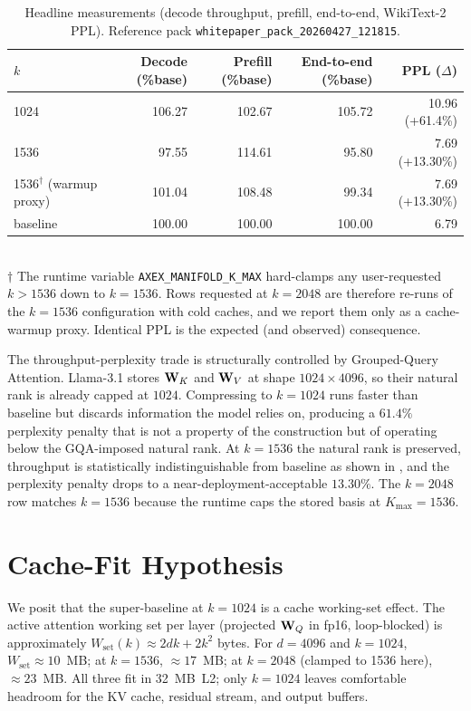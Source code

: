 \documentclass[11pt]{article}
\begin{document}
\begin{table}[h]\centering\small
\caption{Headline measurements (decode throughput, prefill, end-to-end,
WikiText-2 PPL).  Reference pack \texttt{whitepaper\_pack\_20260427\_121815}.}
\label{tab:headline}
\begin{tabular}{@{}lrrrr@{}}
\toprule
$k$ & Decode (\%base) & Prefill (\%base) & End-to-end (\%base) & PPL ($\Delta$) \\
\midrule
1024 & 106.27 & 102.67 & 105.72 & 10.96 (+61.4\%) \\
1536 & 97.55 & 114.61 & 95.80  & 7.69 (+13.30\%) \\
1536$^\dagger$ (warmup proxy) & 101.04 & 108.48 & 99.34 & 7.69 (+13.30\%) \\
\midrule
baseline & 100.00 & 100.00 & 100.00 & 6.79 \\
\bottomrule
\end{tabular}
\medskip\\
{\footnotesize $\dagger$ The runtime variable
\texttt{AXEX\_MANIFOLD\_K\_MAX} hard-clamps any user-requested $k>1536$
down to $k{=}1536$.  Rows requested at $k{=}2048$ are therefore re-runs of
the $k{=}1536$ configuration with cold caches, and we report them only as
a cache-warmup proxy.  Identical PPL is the expected (and observed)
consequence.}
\end{table}

The throughput-perplexity trade is structurally controlled by Grouped-Query
Attention. Llama-3.1 stores $\mathbf{W}_K$ and $\mathbf{W}_V$ at shape $1024\times4096$,
so their natural rank is already capped at $1024$. Compressing to $k{=}1024$
runs faster than baseline but discards information the model relies on,
producing a $61.4\%$ perplexity penalty that is not a property of the
construction but of operating below the GQA-imposed natural rank. At
$k{=}1536$ the natural rank is preserved, throughput is statistically
indistinguishable from baseline as shown in , and the
perplexity penalty drops to a near-deployment-acceptable $13.30\%$. The
$k{=}2048$ row matches $k{=}1536$ because the runtime caps the stored basis
at $K_\text{max}{=}1536$.

\section{Cache-Fit Hypothesis}
\label{sec:cachefit}
We posit that the super-baseline at $k{=}1024$ is a cache working-set effect.
The active attention working set per layer (projected $\mathbf{W}_Q$ in fp16,
loop-blocked) is approximately $W_\text{set}(k) \approx 2 d k\!+\!2 k^2$ bytes.
For $d{=}4096$ and $k{=}1024$, $W_\text{set}\!\approx\!10$~MB; at $k{=}1536$,
$\approx\!17$~MB; at $k{=}2048$ (clamped to 1536 here), $\approx\!23$~MB.  All
three fit in 32~MB~L2; only $k{=}1024$ leaves comfortable headroom for the KV
cache, residual stream, and output buffers.
\end{document}

